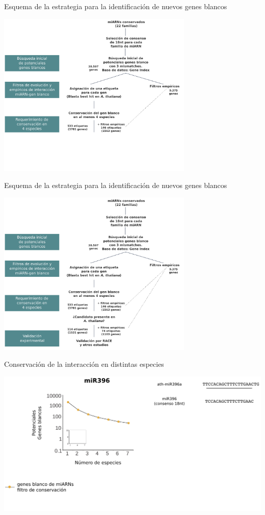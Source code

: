 \documentclass{beamer}
\begin{document}
\begin{frame}{Esquema de la estrategia para la identificación de nuevos genes blancos}
	\begin{center}
		\includegraphics[width=0.7\textwidth]{img/NAR_fig01_03.png}
	\end{center}
\end{frame}


\begin{frame}{Esquema de la estrategia para la identificación de nuevos genes blancos}
	\begin{center}
		\includegraphics[width=0.7\textwidth]{img/NAR_fig01_04.png}
	\end{center}
\end{frame}

\begin{frame}{Conservación de la interacción en distintas especies}
	\begin{center}
		\includegraphics[width=1\textwidth]{img/NAR_fig2_01.png}
	\end{center}
\end{frame}
\end{document}
